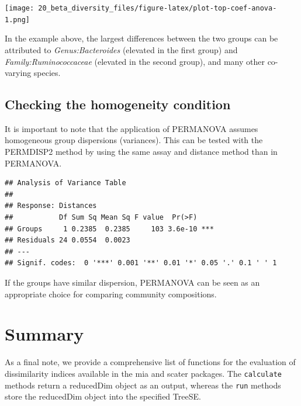 \documentclass[
]{book}
\newenvironment{Shaded}{\begin{snugshade}}{\end{snugshade}}
\newcommand{\FunctionTok}[1]{\textcolor[rgb]{0.00,0.00,0.00}{#1}}
\newcommand{\NormalTok}[1]{#1}
\newcommand{\SpecialCharTok}[1]{\textcolor[rgb]{0.00,0.00,0.00}{#1}}
\newcommand{\StringTok}[1]{\textcolor[rgb]{0.31,0.60,0.02}{#1}}
\begin{document}
\texttt{[image: 20\_beta\_diversity\_files/figure-latex/plot-top-coef-anova-1.png]}

In the example above, the largest differences between the two groups
can be attributed to \emph{Genus:Bacteroides} (elevated in the first
group) and \emph{Family:Ruminococcaceae} (elevated in the second
group), and many other co-varying species.

\hypertarget{checking-the-homogeneity-condition}{%
\subsection{Checking the homogeneity condition}\label{checking-the-homogeneity-condition}}

It is important to note that the application of PERMANOVA assumes
homogeneous group dispersions (variances). This can be tested with the
PERMDISP2 method \citep{Anderson2006} by using the same assay and distance
method than in PERMANOVA.

\begin{Shaded}
\end{Shaded}

\begin{verbatim}
## Analysis of Variance Table
## 
## Response: Distances
##           Df Sum Sq Mean Sq F value  Pr(>F)    
## Groups     1 0.2385  0.2385     103 3.6e-10 ***
## Residuals 24 0.0554  0.0023                    
## ---
## Signif. codes:  0 '***' 0.001 '**' 0.01 '*' 0.05 '.' 0.1 ' ' 1
\end{verbatim}

If the groups have similar dispersion, PERMANOVA can be seen as an
appropriate choice for comparing community compositions.

\hypertarget{summary}{%
\section{Summary}\label{summary}}

As a final note, we provide a comprehensive list of functions for the evaluation
of dissimilarity indices available in the mia and scater packages. The
\texttt{calculate} methods return a reducedDim object as an output, whereas the \texttt{run}
methods store the reducedDim object into the specified TreeSE.
\end{document}
